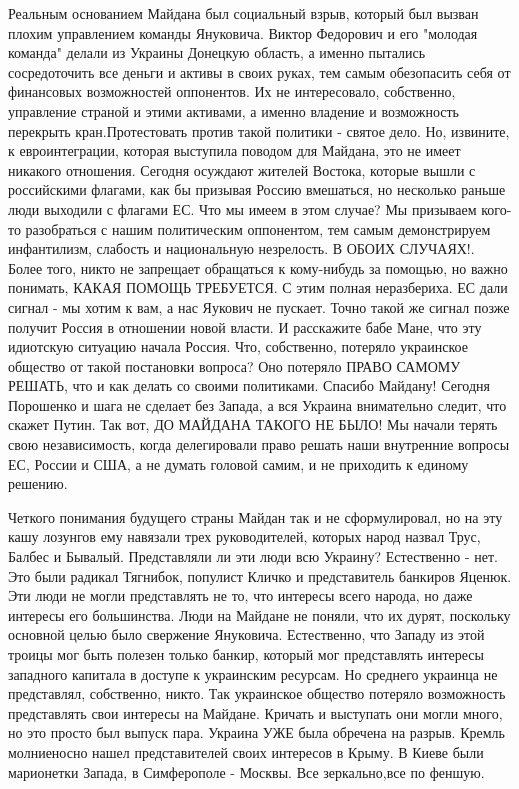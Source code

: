 Реальным основанием Майдана был социальный взрыв, который был вызван плохим
управлением команды Януковича. Виктор Федорович и его "молодая команда" делали
из Украины Донецкую область, а именно пытались сосредоточить все деньги и
активы в своих руках, тем самым обезопасить себя от финансовых возможностей
оппонентов. Их не интересовало, собственно, управление страной и этими
активами, а именно владение и возможность перекрыть кран.Протестовать против
такой политики - святое дело. Но, извините, к евроинтеграции, которая выступила
поводом для Майдана, это не имеет никакого отношения. Сегодня осуждают жителей
Востока, которые вышли с российскими флагами, как бы призывая Россию вмешаться,
но несколько раньше люди выходили с флагами ЕС. Что мы имеем в этом случае? Мы
призываем кого-то разобраться с нашим политическим оппонентом, тем самым
демонстрируем инфантилизм, слабость и национальную незрелость. В ОБОИХ
СЛУЧАЯХ!. Более того, никто не запрещает обращаться к кому-нибудь за помощью,
но важно понимать, КАКАЯ ПОМОЩЬ ТРЕБУЕТСЯ. С этим полная неразбериха. ЕС дали
сигнал - мы хотим к вам, а нас Яукович не пускает. Точно такой же сигнал позже
получит Россия в отношении новой власти. И расскажите бабе Мане, что эту
идиотскую ситуацию начала Россия. Что, собственно, потеряло украинское общество
от такой постановки вопроса? Оно потеряло ПРАВО САМОМУ РЕШАТЬ, что и как делать
со своими политиками. Спасибо Майдану! Сегодня Порошенко и шага не сделает без
Запада, а вся Украина внимательно следит, что скажет Путин. Так вот, ДО МАЙДАНА
ТАКОГО НЕ БЫЛО! Мы начали терять свою независимость, когда делегировали право
решать наши внутренние вопросы ЕС, России и США, а не думать головой самим, и
не приходить к единому решению. 

Четкого понимания будущего страны Майдан так и не сформулировал, но на эту кашу
лозунгов ему навязали трех руководителей, которых народ назвал Трус, Балбес и
Бывалый. Представляли ли эти люди всю Украину? Естественно - нет. Это были
радикал Тягнибок, популист Кличко и представитель банкиров Яценюк. Эти люди не
могли представлять не то, что интересы всего народа, но даже интересы его
большинства. Люди на Майдане не поняли, что их дурят, поскольку основной целью
было свержение Януковича. Естественно, что Западу из этой троицы мог быть
полезен только банкир, который мог представлять интересы западного капитала в
доступе к украинским ресурсам. Но среднего украинца не представлял, собственно,
никто. Так украинское общество потеряло возможность представлять свои интересы
на Майдане. Кричать и выступать они могли много, но это просто был выпуск пара.
Украина УЖЕ была обречена на разрыв. Кремль молниеносно нашел представителей
своих интересов в Крыму. В Киеве были марионетки Запада, в Симферополе -
Москвы. Все зеркально,все по феншую. 

